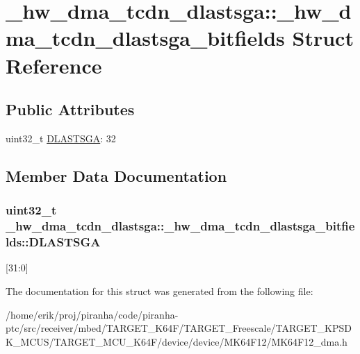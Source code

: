\hypertarget{struct__hw__dma__tcdn__dlastsga_1_1__hw__dma__tcdn__dlastsga__bitfields}{}\section{\+\_\+hw\+\_\+dma\+\_\+tcdn\+\_\+dlastsga\+:\+:\+\_\+hw\+\_\+dma\+\_\+tcdn\+\_\+dlastsga\+\_\+bitfields Struct Reference}
\label{struct__hw__dma__tcdn__dlastsga_1_1__hw__dma__tcdn__dlastsga__bitfields}
\subsection*{Public Attributes}
\begin{DoxyCompactItemize}
\item 
uint32\+\_\+t \hyperlink{struct__hw__dma__tcdn__dlastsga_1_1__hw__dma__tcdn__dlastsga__bitfields_a3d4e99964ebe5ca5aac6f1f0ebdb199b}{D\+L\+A\+S\+T\+S\+GA}\+: 32
\end{DoxyCompactItemize}


\subsection{Member Data Documentation}
\subsubsection[{\texorpdfstring{D\+L\+A\+S\+T\+S\+GA}{DLASTSGA}}]{\setlength{\rightskip}{0pt plus 5cm}uint32\+\_\+t \+\_\+hw\+\_\+dma\+\_\+tcdn\+\_\+dlastsga\+::\+\_\+hw\+\_\+dma\+\_\+tcdn\+\_\+dlastsga\+\_\+bitfields\+::\+D\+L\+A\+S\+T\+S\+GA}\hypertarget{struct__hw__dma__tcdn__dlastsga_1_1__hw__dma__tcdn__dlastsga__bitfields_a3d4e99964ebe5ca5aac6f1f0ebdb199b}{}\label{struct__hw__dma__tcdn__dlastsga_1_1__hw__dma__tcdn__dlastsga__bitfields_a3d4e99964ebe5ca5aac6f1f0ebdb199b}
\mbox{[}31\+:0\mbox{]} 

The documentation for this struct was generated from the following file\+:\begin{DoxyCompactItemize}
\item 
/home/erik/proj/piranha/code/piranha-\/ptc/src/receiver/mbed/\+T\+A\+R\+G\+E\+T\+\_\+\+K64\+F/\+T\+A\+R\+G\+E\+T\+\_\+\+Freescale/\+T\+A\+R\+G\+E\+T\+\_\+\+K\+P\+S\+D\+K\+\_\+\+M\+C\+U\+S/\+T\+A\+R\+G\+E\+T\+\_\+\+M\+C\+U\+\_\+\+K64\+F/device/device/\+M\+K64\+F12/M\+K64\+F12\+\_\+dma.\+h\end{DoxyCompactItemize}
